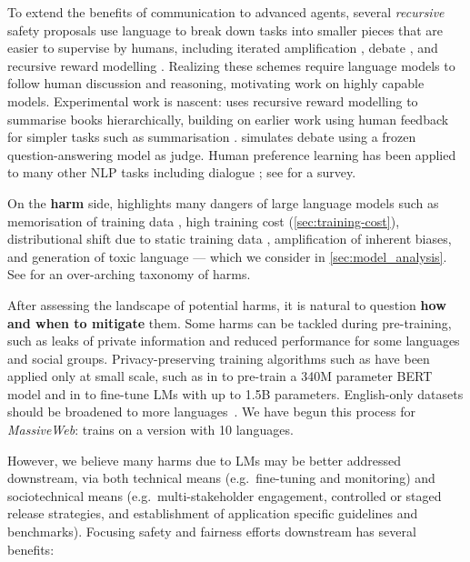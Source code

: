 To extend the benefits of communication to advanced agents, several \textit{recursive} safety proposals use language to break down tasks into smaller pieces that are easier to supervise by humans, including iterated amplification \citep{christiano2018amplification}, debate \citep{irving2018debate,irving2019social}, and recursive reward modelling \citep{leike2018scalable}.  Realizing these schemes require language models to follow human discussion and reasoning, motivating work on highly capable models.  Experimental work is nascent: \cite{wu2021recursively} uses recursive reward modelling to summarise books hierarchically, building on earlier work using human feedback for simpler tasks such as summarisation \citep{bohm2019better,ziegler2019fine,stiennon2020learning}. \citet{perez2019finding} simulates debate using a frozen question-answering model as judge.  Human preference learning has been applied to many other NLP tasks including dialogue \citep{jaques2020human}; see \cite{wang2021putting} for a survey.

On the \textbf{harm} side, \cite{bender2021dangers} highlights many dangers of large language models such as memorisation of training data \citep{carlini2021extracting,abubakar2021copilot}, high training cost (\autoref{sec:training-cost}), distributional shift due to static training data \citep{lazaridou2021pitfalls}, amplification of inherent biases, and generation of toxic language \citep{gehman2020realtoxicityprompts} --- which we consider in \autoref{sec:model_analysis}. See \citet{weidinger2021harms} for an over-arching taxonomy of harms.

After assessing the landscape of potential harms, it is natural to question \textbf{how and when to mitigate} them. Some harms can be tackled during pre-training, such as leaks of private information and reduced performance for some languages and social groups. Privacy-preserving training algorithms such as \citet{abadi2016deep} have been applied only at small scale, such as in \cite{anil2021large} to pre-train a 340M parameter BERT model and in \citet{yu2021differentially} to fine-tune LMs with up to 1.5B parameters. English-only datasets should be broadened to more languages~\citep{xue2020mt5}. We have begun this process for \textit{MassiveWeb}: \cite{borgeaud2021retrieval} trains on a version with 10 languages.

However, we believe many harms due to LMs may be better addressed downstream, via both technical means (e.g.\ fine-tuning and monitoring) and sociotechnical means (e.g.\ multi-stakeholder engagement, controlled or staged release strategies, and establishment of application specific guidelines and benchmarks). Focusing safety and fairness efforts downstream has several benefits:


